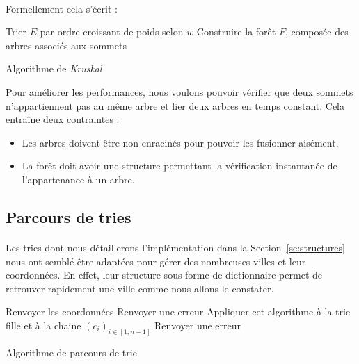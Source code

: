 \documentclass[a4paper]{article}
\begin{document}
\paragraph*{}
Formellement cela s'écrit :

\medskip

\begin{algorithm}[H]
\SetAlgoLined
{}
Trier $E$ par ordre croissant de poids selon $w$\;
Construire la forêt $F$, composée des arbres associés aux sommets\;
\caption{Algorithme de \emph{Kruskal}}
\end{algorithm}

\medskip

Pour améliorer les performances, nous voulons pouvoir vérifier que deux sommets n'appartiennent pas au même arbre et lier deux arbres en temps constant. Cela entraîne deux contraintes :
\begin{itemize}
\item Les arbres doivent être non-enracinés pour pouvoir les fusionner aisément.
\item La forêt doit avoir une structure permettant la vérification instantanée de l'appartenance à un arbre.
\end{itemize}

\subsection{Parcours de tries}

\paragraph*{}Les tries dont nous détaillerons l'implémentation dans la Section~\ref{se:structures} nous ont semblé être adaptées pour gérer des nombreuses villes et leur coordonnées. En effet, leur structure sous forme de dictionnaire permet de retrouver rapidement une ville comme nous allons le constater.

\medskip

\begin{algorithm}[H]
  \SetAlgoLined
   {
     {
       {
        Renvoyer les coordonnées\;
      }{
        Renvoyer une erreur\;
      }
    }{
      Appliquer cet algorithme à la trie fille et à la chaine $(c_i)_{i \in [1,n-1]}$ \;
    }
  }{
    Renvoyer une erreur\;
  }
\caption{Algorithme de parcours de trie}
\end{algorithm}
\end{document}
